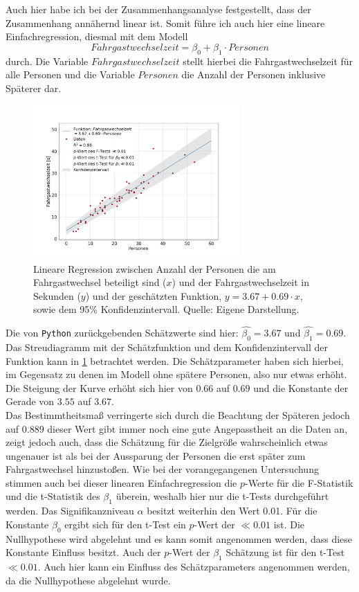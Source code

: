 Auch hier habe ich bei der Zusammenhangsanalyse festgestellt, dass der Zusammenhang annähernd linear ist. Somit führe ich auch hier eine lineare Einfachregression, diesmal mit dem Modell
\begin{equation}
Fahrgastwechselzeit = \beta_0 + \beta_1 \cdot Personen
\end{equation}
durch. Die Variable $Fahrgastwechselzeit$ stellt hierbei die Fahrgastwechselzeit für alle Personen und die Variable $Personen$ die Anzahl der Personen inklusive Späterer dar.
\begin{figure}[H]
	\centering
		\includegraphics[width=0.7\textwidth]{pictures/data_evaluation/transferTime/lin_transfer_time.png}
	\caption{Lineare Regression zwischen Anzahl der Personen die am Fahrgastwechsel beteiligt sind ($x$) und der Fahrgastwechselzeit in Sekunden ($y$) und der geschätzten Funktion, $y= 3.67 + 0.69 \cdot x$, sowie dem 95\% Konfidenzintervall. Quelle: Eigene Darstellung.}
	\label{fig:LinRegAlle}
\end{figure}
Die von \texttt{Python} zurückgebenden Schätzwerte sind hier: $\hat{\beta_0}=3.67$ und $\hat{\beta_1}=0.69$. Das Streudiagramm mit der Schätzfunktion und dem Konfidenzintervall der Funktion kann in \figurename \ref{fig:LinRegAlle} betrachtet werden.
Die Schätzparameter haben sich hierbei, im Gegensatz zu denen im Modell ohne spätere Personen, also nur etwas erhöht. Die Steigung der Kurve erhöht sich hier von $0.66$ auf $0.69$ und die Konstante der Gerade von $3.55$ auf $3.67$. \\
Das Bestimmtheitsmaß verringerte sich durch die Beachtung der Späteren jedoch auf $0.889$ dieser Wert gibt immer noch eine gute Angepasstheit an die Daten an, zeigt jedoch auch, dass die Schätzung für die Zielgröße wahrscheinlich etwas ungenauer ist als bei der Aussparung der Personen die erst später zum Fahrgastwechsel hinzustoßen. Wie bei der vorangegangenen Untersuchung stimmen auch bei dieser linearen Einfachregression die $p$-Werte für die F-Statistik und die t-Statistik des $\beta_1$ überein, weshalb hier nur die t-Tests durchgeführt werden. Das Signifikanzniveau $\alpha$ besitzt weiterhin den Wert 0.01. Für die Konstante $\beta_0$ ergibt sich für den t-Test ein $p$-Wert der $\ll 0.01$ ist. Die Nullhypothese wird abgelehnt und es kann somit angenommen werden, dass diese Konstante Einfluss besitzt. Auch der $p$-Wert der $\beta_1$ Schätzung ist für den t-Test $\ll 0.01$. Auch hier kann ein Einfluss des Schätzparameters angenommen werden, da die Nullhypothese abgelehnt wurde.


